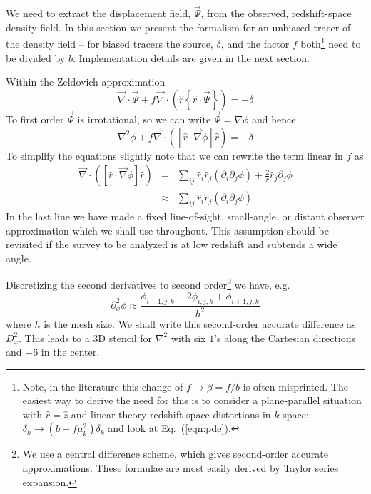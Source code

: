 \documentclass[a4paper,11pt]{article}
\begin{document}
We need to extract the displacement field, $\vec{\Psi}$, from the observed,
redshift-space density field.  In this section we present the formalism for
an unbiased tracer of the density field -- for biased tracers the source,
$\delta$, and the factor $f$ both\footnote{Note, in the literature this change
of $f\to\beta=f/b$ is often misprinted.  The easiest way to derive the need
for this is to consider a plane-parallel situation with $\hat{r}=\hat{z}$ and
linear theory redshift space distortions in $k$-space:
$\delta_k\to (b+f\mu_k^2)\delta_k$ and look at Eq.~(\ref{eqn:pde}).}
need to be divided by $b$.
Implementation details are given in the next section.

Within the Zeldovich approximation \cite{Zel70}
\begin{equation}
  \vec{\nabla}\cdot\vec{\Psi} + f\vec{\nabla}\cdot
  \left(\hat{r}\left\{\hat{r}\cdot\vec{\Psi}\right\}\right)
  = -\delta
\end{equation}
To first order $\vec{\Psi}$ is irrotational, so we can write
$\vec{\Psi}=\nabla\phi$ and hence
\begin{equation}
  \nabla^2\phi +
  f\vec{\nabla}\cdot\left( \left[\hat{r}\cdot\vec{\nabla}\phi\right]
  \hat{r}\right) = -\delta
\label{eqn:pde}
\end{equation}
To simplify the equations slightly note that we can rewrite the term
linear in $f$ as
\begin{eqnarray}
 \vec{\nabla}\cdot\left( \left[\hat{r}\cdot\vec{\nabla}\phi\right]\hat{r}\right)
 &=& \sum_{ij}\hat{r}_i\hat{r}_j\left(\partial_i\partial_j\phi\right)
  +  \frac{2}{r}\hat{r}_j\partial_j\phi \\
 &\approx& \sum_{ij}\hat{r}_i\hat{r}_j\left(\partial_i\partial_j\phi\right)
\label{eqn:fterm}
\end{eqnarray}
In the last line we have made a fixed line-of-sight, small-angle, or distant
observer approximation which we shall use throughout.  This assumption
should be revisited if the survey to be analyzed is at low redshift and
subtends a wide angle.

Discretizing the second derivatives to second order\footnote{We use a central
difference scheme, which gives second-order accurate approximations.  These
formulae are most easily derived by Taylor series expansion.} 
we have, e.g.
\begin{equation}
  \partial_x^2\phi \approx \frac{\phi_{i-1,j,k}-2\phi_{i,j,k}+\phi_{i+1,j,k}}
  {h^2}
\end{equation}
where $h$ is the mesh size.  We shall write this second-order accurate
difference as $D_x^2$.  This leads to a 3D stencil for $\nabla^2$ with
six $1$'s along the Cartesian directions and $-6$ in the center.
\end{document}
